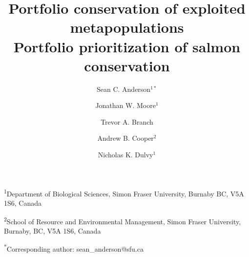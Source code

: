 \documentclass[12pt]{article}
\title{Portfolio conservation of exploited metapopulations\\Portfolio 
  prioritization of salmon conservation }
\author{Sean C. Anderson$^{1*}$ \and Jonathan W. Moore$^1$ \and Trevor A. Branch
  \and Andrew B. Cooper$^2$ \and Nicholas K.  Dulvy$^1$}
\date{}
\begin{document}
\maketitle

\noindent
  \textsuperscript{1}Department of Biological Sciences, Simon Fraser
  University, Burnaby BC, V5A 1S6, Canada

\noindent
	\textsuperscript{2}School of Resource and Environmental Management, Simon
  Fraser University, Burnaby, BC, V5A 1S6, Canada

\noindent
	\textsuperscript{*}Corresponding author: sean\_anderson@sfu.ca

\clearpage




\renewcommand{\thetable}{S\arabic{table}}
\setcounter{table}{0} %

\renewcommand{\thefigure}{S\arabic{figure}}
\renewcommand{\figurename}{Fig.}
\setcounter{figure}{0}  %



\end{document}
